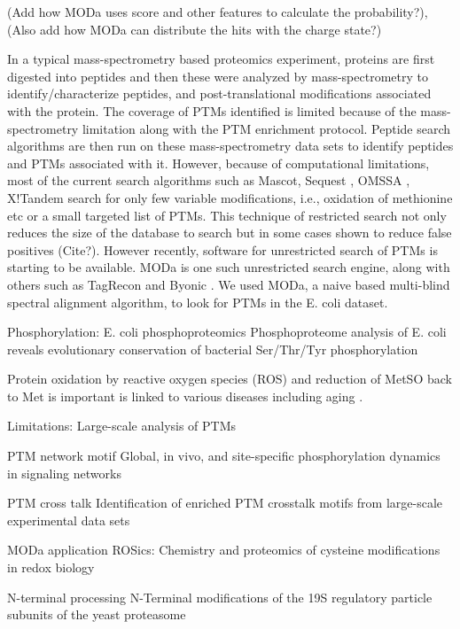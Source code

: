 \documentclass[12pt]{article}
\begin{document}
(Add how MODa uses score and other features to calculate the probability?), (Also add how MODa can distribute the hits with the charge state?)

In a typical mass-spectrometry based proteomics experiment, proteins are first digested into peptides and then these were analyzed by mass-spectrometry to identify/characterize peptides, and post-translational modifications associated with the protein. The coverage of PTMs identified is limited because of the mass-spectrometry limitation along with the PTM enrichment protocol. Peptide search algorithms are then run on these mass-spectrometry data sets to identify peptides and PTMs associated with it. However, because of computational limitations, most of the current search algorithms such as Mascot\cite{Perkinsetal1999}, Sequest \cite{Engetal1994}, OMSSA \cite{Geeretal2004}, X!Tandem \cite{CraigBeavis2004} search for only few variable modifications, i.e., oxidation of methionine etc or a small targeted list of PTMs. This technique of restricted search not only reduces the size of the database to search but in some cases shown to reduce false positives (Cite?). However recently, software for unrestricted search of PTMs is starting to be available. MODa \cite{Naetal2012} is one such unrestricted search engine, along with others such as TagRecon\cite{Dasarietal2010} and Byonic \cite{Bernetal2012}. We used MODa, a naive based multi-blind spectral alignment algorithm, to look for PTMs in the E. coli dataset. 

Phosphorylation:
E. coli phosphoproteomics \cite{Maceketal2008}
{Phosphoproteome analysis of E. coli reveals evolutionary conservation of bacterial Ser/Thr/Tyr phosphorylation}

Protein oxidation by reactive oxygen species (ROS) and reduction of MetSO back to Met is important is linked to various diseases including aging \cite{Stadtman1992}.

Limitations:
Large-scale analysis of PTMs \cite{OlsenMann2013}

PTM network motif \cite{Olsenetal2006}
{Global, in vivo, and site-specific phosphorylation dynamics in signaling networks}

PTM cross talk \cite{Pengetal2014}
{Identification of enriched PTM crosstalk motifs from large-scale experimental data sets}

MODa application \cite{Kimetal2014}
{ROSics: Chemistry and proteomics of cysteine modifications in redox biology}

N-terminal processing \cite{Kimuraetal2003}
{N-Terminal modifications of the 19S regulatory particle subunits of the yeast proteasome}
\end{document}

